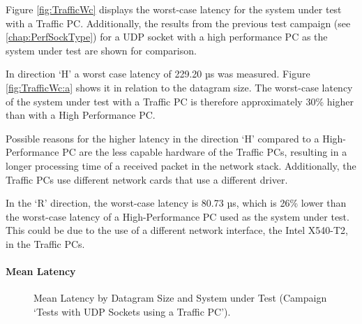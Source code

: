 Figure \ref{fig:TrafficWc} displays the worst-case latency for the system under test with a Traffic PC. Additionally, the results from the previous test campaign (see \ref{chap:PerfSockType}) for a UDP socket with a high performance PC as the system under test are shown for comparison.

In direction `H' a worst case latency of 229.20 µs was measured. Figure \ref{fig:TrafficWc:a} shows it in relation to the datagram size. The worst-case latency of the system under test with a Traffic PC is therefore approximately 30\% higher than with a High Performance PC.

Possible reasons for the higher latency in the direction `H' compared to a High-Performance PC are the  less capable hardware of the Traffic PCs, resulting in a longer processing time of a received packet in the network stack. Additionally, the Traffic PCs use different network cards that use a different driver.

In the `R' direction, the worst-case latency is 80.73 µs, which is 26\% lower than the worst-case latency of a High-Performance PC used as the system under test. This could be due to the use of a different network interface, the Intel X540-T2, in the Traffic PCs.

\paragraph{Mean Latency}
\begin{figure}[h!]
  \centering
  \caption{Mean Latency by Datagram Size and System under Test (Campaign `Tests with UDP Sockets using a Traffic PC').}
  \label{fig:TrafficMean}
\end{figure}

